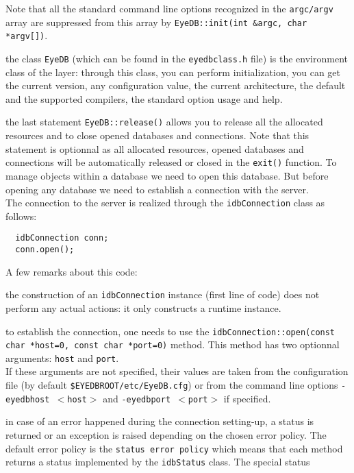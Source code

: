 \normalsize
Note that all the standard command line options recognized in the
\texttt{argc/argv} array are suppressed from this array by
\texttt{EyeDB::init(int \&argc, char *argv[])}.
\item the class \texttt{EyeDB} (which can be found in the \texttt{eyedbclass.h}
file) is the environment class of the \eyedb layer: through this class,
you can perform initialization, you can get the current \eyedb version,
any configuration value, the current architecture,
the default and the supported compilers, the standard option usage and help.
\item the last statement \texttt{EyeDB::release()} allows you to release all
the \eyedb allocated resources and to close opened databases and connections.
Note that this statement is optionnal as all \eyedb allocated resources,
opened databases and connections will be automatically released or closed
in the \texttt{exit()} function.
\ee
{}
To manage objects within a database we need to open this database.
But before opening any database we need to establish a connection with
the \eyedb server.
\\
The connection to the \eyedb server is realized through the
\texttt{idbConnection} class as follows:
\verbsize
\begin{verbatim}
  idbConnection conn;
  conn.open();
\end{verbatim}
\normalsize
A few remarks about this code:
\be
\item the construction of an \texttt{idbConnection} instance (first line of code)
does not perform any actual actions: it only constructs a runtime instance.
\item to establish the connection, one needs to use the
\texttt{idbConnection::open(const char *host=0, const char *port=0)} method.
This method has two optionnal arguments: \texttt{host} and \texttt{port}.
\\
If these arguments are not specified, their values are taken from the
configuration file (by default \texttt{\$EYEDBROOT/etc/EyeDB.cfg}) or
from the command line options \texttt{-eyedbhost $<$host$>$} and
\texttt{-eyedbport $<$port$>$} if specified.
\item in case of an error happened during the connection setting-up,
a status is returned or an exception is raised depending on the
chosen error policy. The default error policy is the \texttt{status error
policy} which means that each \eyedb method returns a status
implemented by the \texttt{idbStatus} class. The special status

